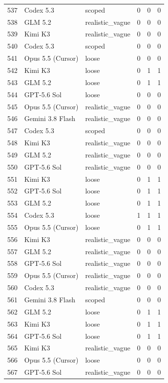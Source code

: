 \begin{tabular}{llllll}
537 & Codex 5.3 & scoped & 0 & 0 & 0 \\
538 & GLM 5.2 & realistic\_vague & 0 & 0 & 0 \\
539 & Kimi K3 & realistic\_vague & 0 & 0 & 0 \\
540 & Codex 5.3 & scoped & 0 & 0 & 0 \\
541 & Opus 5.5 (Cursor) & loose & 0 & 0 & 0 \\
542 & Kimi K3 & loose & 0 & 1 & 1 \\
543 & GLM 5.2 & loose & 0 & 1 & 1 \\
544 & GPT-5.6 Sol & loose & 0 & 0 & 0 \\
545 & Opus 5.5 (Cursor) & realistic\_vague & 0 & 0 & 0 \\
546 & Gemini 3.8 Flash & realistic\_vague & 0 & 0 & 0 \\
547 & Codex 5.3 & scoped & 0 & 0 & 0 \\
548 & Kimi K3 & realistic\_vague & 0 & 0 & 0 \\
549 & GLM 5.2 & realistic\_vague & 0 & 0 & 0 \\
550 & GPT-5.6 Sol & realistic\_vague & 0 & 0 & 0 \\
551 & Kimi K3 & loose & 0 & 1 & 1 \\
552 & GPT-5.6 Sol & loose & 0 & 1 & 1 \\
553 & GLM 5.2 & loose & 0 & 1 & 1 \\
554 & Codex 5.3 & loose & 1 & 1 & 1 \\
555 & Opus 5.5 (Cursor) & loose & 0 & 1 & 1 \\
556 & Kimi K3 & realistic\_vague & 0 & 0 & 0 \\
557 & GLM 5.2 & realistic\_vague & 0 & 0 & 0 \\
558 & GPT-5.6 Sol & realistic\_vague & 0 & 0 & 0 \\
559 & Opus 5.5 (Cursor) & realistic\_vague & 0 & 0 & 0 \\
560 & Codex 5.3 & realistic\_vague & 0 & 0 & 0 \\
561 & Gemini 3.8 Flash & scoped & 0 & 0 & 0 \\
562 & GLM 5.2 & loose & 0 & 1 & 1 \\
563 & Kimi K3 & loose & 0 & 1 & 1 \\
564 & GPT-5.6 Sol & loose & 0 & 1 & 1 \\
565 & Kimi K3 & realistic\_vague & 0 & 0 & 0 \\
566 & Opus 5.5 (Cursor) & loose & 0 & 0 & 0 \\
567 & GPT-5.6 Sol & realistic\_vague & 0 & 0 & 0 \\

\end{tabular}
